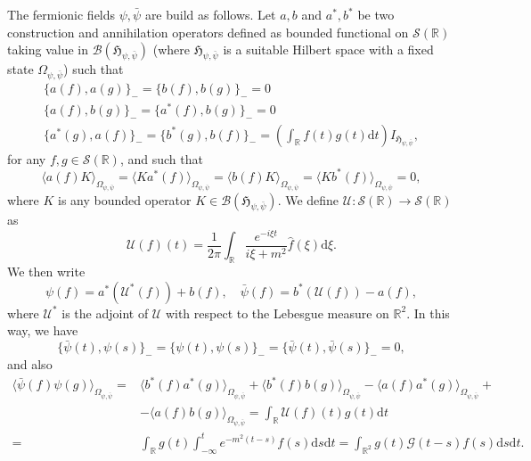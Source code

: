 \documentclass[a4paper,10pt]{article}
\newcommand{\mathd}{\mathrm{d}}
\begin{document}
The fermionic fields $\psi, \bar{\psi}$ are build as follows. Let $a, b$ and
$a^{\ast}, b^{\ast}$ be two construction and annihilation operators defined as
bounded functional on $\mathcal{S} (\mathbb{R})$ taking value in $\mathcal{B}
(\mathfrak{H}_{\psi, \bar{\psi}})$ (where $\mathfrak{H}_{\psi, \bar{\psi}}$ is
a suitable Hilbert space with a fixed state $\Omega_{\psi, \bar{\psi}}$) such
that
\begin{eqnarray}
  & \{ a (f), a (g)^{} \}_- = \{ b (f), b (g)^{} \}_- = 0 &  \nonumber\\
  & \{ a (f), b (g)^{} \}_- = \{ a^{\ast} (f), b (g)^{} \}_- = 0 & 
  \nonumber\\
  & \{ a^{\ast} (g), a (f) \}_- = \{ b^{\ast} (g), b (f) \}_- = \left(
  \int_{\mathbb{R}} f (t) g (t) \mathd t \right) I_{\mathfrak{H}_{\psi,
  \bar{\psi}}}, &  \nonumber
\end{eqnarray}
for any $f, g \in \mathcal{S} (\mathbb{R})$, and such that
\[ \langle a (f) K \rangle_{\Omega_{\psi, \bar{\psi}}} = \langle K a^{\ast}
   (f) \rangle_{\Omega_{\psi, \bar{\psi}}} = \langle b (f) K
   \rangle_{\Omega_{\psi, \bar{\psi}}} = \langle K b^{\ast} (f)
   \rangle_{\Omega_{\psi, \bar{\psi}}} = 0, \]
where $K$ is any bounded operator $K \in \mathcal{B} (\mathfrak{H}_{\psi,
\bar{\psi}})$. We define $\mathcal{U} : \mathcal{S} (\mathbb{R}) \rightarrow
\mathcal{S} (\mathbb{R})$ as
\[ \mathcal{U} (f) (t) = \frac{1}{2 \pi} \int_{\mathbb{R}} \frac{e^{- i \xi
   t}}{i \xi + m^2} \hat{f} (\xi) \mathd \xi . \]
We then write
\[ \psi (f) = a^{\ast} (\mathcal{U}^{\ast} (f)) + b (f), \quad \bar{\psi} (f)
   = b^{\ast} (\mathcal{U} (f)) - a (f), \]
where $\mathcal{U}^{\ast}$ is the adjoint of $\mathcal{U}$ with respect to the
Lebesgue measure on $\mathbb{R}^2$. In this way, we have
\[ \{ \bar{\psi} (t), \psi (s) \}_- = \{ \psi (t), \psi (s) \}_- = \{
   \bar{\psi} (t), \bar{\psi} (s) \}_- = 0, \]
and also
\[ \begin{array}{rl}
     \langle \bar{\psi} (f_{}) \psi (g) \rangle_{\Omega_{\psi, \bar{\psi}}} =
     & \langle b^{\ast} (f) a^{\ast} (g) \rangle_{\Omega_{\psi, \bar{\psi}}} +
     \langle b^{\ast} (f) b (g) \rangle_{\Omega_{\psi, \bar{\psi}}} - \langle
     a (f) a^{\ast} (g) \rangle_{\Omega_{\psi, \bar{\psi}}}+\\
     & - \langle a (f) b (g) \rangle_{\Omega_{\psi, \bar{\psi}}} =
     \int_{\mathbb{R}} \mathcal{U} (f) (t) g (t) \mathd t\\
     = & \int_{\mathbb{R}} g (t) \int_{- \infty}^t e^{- m^2 (t - s)} f (s)
     \mathd s \mathd t = \int_{\mathbb{R}^2} g (t) \mathcal{G} (t - s) f (s)
     \mathd s \mathd t.
   \end{array} \]
\end{document}
